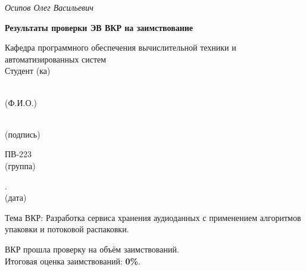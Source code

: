 \documentclass[14pt]{extarticle}
\begin{document}
\vspace{2em}

{\small
	\noindent{} \textit{Осипов Олег Васильевич}}\\[-0.5em]
\noindent
\hspace*{5cm}{\footnotesize (подпись)}
\hspace{5cm}{\footnotesize (Ф.И.О.)}


\newpage
\advance\hoffset 1.5cm %
\begin{center}
	\textbf{Результаты проверки ЭВ ВКР на заимствование}
\end{center}

\vspace{1em}

\noindent Кафедра программного обеспечения вычислительной техники и автоматизированных систем\\[0.5em]

\noindent
Студент (ка)\,\makebox[0cm][l]{\underline{\hspace{13.4cm}}}%
\parbox[t]{3.5cm}{\centering {}\\[-0.2em] \footnotesize (Ф.И.О.)\par}%
\parbox[t]{4.5cm}{\centering \,\\[-0.2em] \footnotesize (подпись)\par}%
\parbox[t]{2.2cm}{\centering ПВ-223\\[-0.2em] \footnotesize (группа)\par}%
\parbox[t]{2.5cm}{.\the\year\\[-0.2em] \footnotesize (дата)\par}%


\vspace{1em}

\noindent
Тема ВКР: Разработка сервиса хранения аудиоданных с применением алгоритмов упаковки и потоковой распаковки.

\vspace{1em}

\noindent
ВКР прошла проверку на объём заимствований.\\
Итоговая оценка заимствований: \textbf{0\%}.
\end{document}
